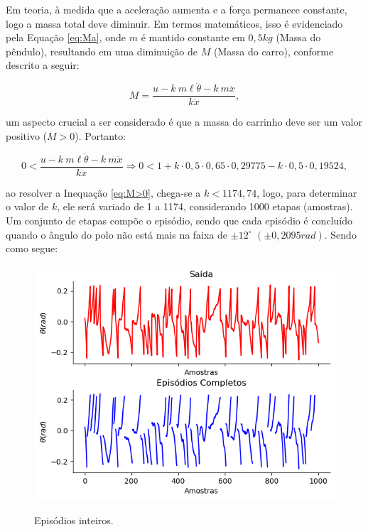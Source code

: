 \documentclass[12pt,           %
a4paper,                       %
openany,                       %
oneside,                       %
chapter=TITLE,                 %
english,                       %
spanish,                       %
brazil,                        %
sumario=tradicional]{abntex2}  %
\begin{document}
\begin{OnehalfSpace}
Em teoria, à medida que a aceleração aumenta e a força permanece constante, logo a massa total deve diminuir. Em termos matemáticos, isso é evidenciado pela Equação \ref{eq:Ma}, onde $m$ é mantido constante em $0,5 kg$ (Massa do pêndulo), resultando em uma diminuição de $M$ (Massa do carro), conforme descrito a seguir:

\begin{equation}
    M = \frac{u - k\:m\ell\ddot{\theta}-k\:m\ddot{x}}{k\ddot{x}},
    \label{eq:Ma}
\end{equation}

\noindent um aspecto crucial a ser considerado é que a massa do carrinho deve ser um valor positivo ($M > 0$). Portanto:

\begin{equation}
    0 < \frac{u - k\:m\ell\ddot{\theta}-k\:m\ddot{x}}{k\ddot{x}} \Rightarrow 0 < 1 + k\cdot 0,5\cdot 0,65\cdot 0,29775-k\cdot 0,5\cdot 0,19524,
    \label{eq:M>0}
\end{equation}

\noindent ao resolver a Inequação \ref{eq:M>0}, chega-se a $k<1174,74$, logo, para determinar o valor de \( k \), ele será variado de 1 a 1174, considerando 1000 etapas (amostras). Um conjunto de etapas compõe o episódio, sendo que cada episódio é concluído quando o ângulo do polo não está mais na faixa de \( \pm 12^\circ \) $(\pm 0,2095rad)$. Sendo como segue:

\begin{figure}[H]
     \centering
     \vspace*{-.25cm}
     \caption{Episódios inteiros.}
     \includegraphics[scale=.6]{episodio.png}
     \label{fig:ep}
\end{figure}
\vspace*{-.8cm}
{\raggedright {}}


\end{OnehalfSpace}
\end{document}
